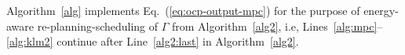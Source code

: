 \documentclass[letterpaper,10pt,conference,twoside]{IEEEtran}
\theoremstyle{definition}
\newtheorem{defn}{Definition}[section]
\begin{document}
Algorithm~\ref{alg} implements Eq.~(\ref{eq:ocp-output-mpc}) for the purpose of energy-aware re-planning-scheduling of $\Gamma$ from Algorithm~\ref{alg2}, i.e, Lines~\ref{alg:mpc}--\ref{alg:klm2} continue after Line~\ref{alg2:last} in Algorithm~\ref{alg2}.







\end{document}
